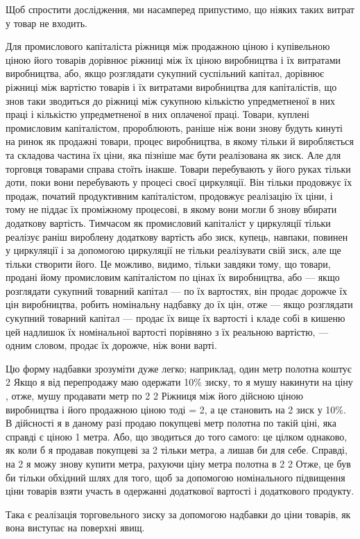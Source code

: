 \parcont{}  %
Щоб спростити дослідження, ми насамперед припустимо, що
ніяких таких витрат у товар не входить.

Для промислового капіталіста ріжниця між продажною ціною
і купівельною ціною його товарів дорівнює ріжниці між їх ціною
виробництва і їх витратами виробництва, або, якщо розглядати
сукупний суспільний капітал, дорівнює ріжниці між
вартістю товарів і їх витратами виробництва для капіталістів,
що знов таки зводиться до ріжниці між сукупною кількістю
упредметненої в них праці і кількістю упредметненої в них
оплаченої праці. Товари, куплені промисловим капіталістом, пророблюють,
раніше ніж вони знову будуть кинуті на ринок як
продажні товари, процес виробництва, в якому тільки й виробляється
та складова частина їх ціни, яка пізніше має бути
реалізована як зиск. Але для торговця товарами справа стоїть
інакше. Товари перебувають у його руках тільки доти, поки
вони перебувають у процесі своєї циркуляції. Він тільки продовжує
їх продаж, початий продуктивним капіталістом, продовжує
реалізацію їх ціни, і тому не піддає їх проміжному процесові,
в якому вони могли б знову вбирати додаткову вартість. Тимчасом
як промисловий капіталіст у циркуляції тільки реалізує
раніш вироблену додаткову вартість або зиск, купець, навпаки,
повинен у циркуляції і за допомогою циркуляції не тільки реалізувати
свій зиск, але ще тільки створити його. Це можливо,
видимо, тільки завдяки тому, що товари, продані йому промисловим
капіталістом по цінах їх виробництва, або — якщо розглядати
сукупний товарний капітал — по їх вартостях, він продає
дорожче їх цін виробництва, робить номінальну надбавку до
їх цін, отже — якщо розглядати сукупний товарний капітал —
продає їх вище їх вартості і кладе собі в кишеню цей надлишок
їх номінальної вартості порівняно з їх реальною вартістю, — одним
словом, продає їх дорожче, ніж вони варті.

Цю форму надбавки зрозуміти дуже легко; наприклад, один
метр полотна коштує 2 Якщо я від перепродажу маю
одержати 10\% зиску, то я мушу накинути на ціну , отже,
мушу продавати метр по 2 2 Ріжниця між його
дійсною ціною виробництва і його продажною ціною тоді = 2, а це становить на 2 зиск у 10\%. В дійсності
я в даному разі продаю покупцеві метр полотна по такій ціні,
яка справді є ціною 1 метра. Або, що зводиться до того
самого: це цілком однаково, як коли б я продавав покупцеві за
2 тільки  метра, а  лишав би для себе. Справді, на
2 я можу знову купити  метра, рахуючи ціну метра
полотна в 2 2 Отже, це був би тільки обхідний
шлях для того, щоб за допомогою номінального підвищення
ціни товарів взяти участь в одержанні додаткової вартості і додаткового
продукту.

Така є реалізація торговельного зиску за допомогою надбавки
до ціни товарів, як вона виступає на поверхні явищ.
\parbreak{}  %

